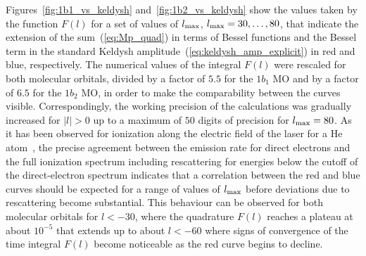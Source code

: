 Figures~\ref{fig:1b1_vs_keldysh} and~\ref{fig:1b2_vs_keldysh} show the
values taken by the function $F(l)$ for a set of values of
$l_{\rm{max}}$, $l_{\rm{max}} = 30,\dots,80$, that indicate the
extension of the sum~(\ref{eq:Mp_quad}) in terms of Bessel functions
and the Bessel term in the standard Keldysh
amplitude~(\ref{eq:keldysh_amp_explicit}) in red and blue,
respectively. The numerical values of the integral $F(l)$ were
rescaled for both molecular orbitals, divided by a factor of $5.5$ for
the $1b_{1}$ MO and by a factor of $6.5$ for the $1b_{2}$ MO, in order
to make the comparability between the curves visible. Correspondingly,
the working precision of the calculations was gradually increased for
$|l| > 0$ up to a maximum of $50$ digits of precision for
$l_{\rm{max}} = 80$. As it has been observed for ionization along the
electric field of the laser for a He atom~\cite{Kopold_1997sfa}, the
precise agreement between the emission rate for direct electrons and
the full ionization spectrum including rescattering for energies below
the cutoff of the direct-electron spectrum indicates that a
correlation between the red and blue curves should be expected for a
range of values of $l_{\rm{max}}$ before deviations due to
rescattering become substantial. This behaviour can be observed for
both molecular orbitals for $l < -30$, where the quadrature $F(l)$
reaches a plateau at about $10^{-5}$ that extends up to about $l <
-60$ where signs of convergence of the time integral $F(l)$ become
noticeable as the red curve begins to decline.

